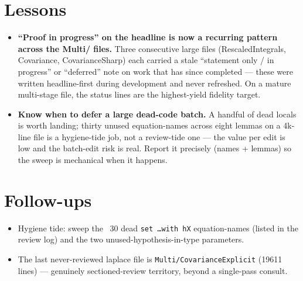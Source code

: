\documentclass[11pt]{article}
\begin{document}
\section{Lessons}
\begin{itemize}[noitemsep]
  \item \textbf{``Proof in progress'' on the headline is now a recurring pattern across the Multi/
    files.} Three consecutive large files (RescaledIntegrals, Covariance, CovarianceSharp) each carried
    a stale ``statement only / in progress'' or ``deferred'' note on work that has since completed ---
    these were written headline-first during development and never refreshed. On a mature multi-stage
    file, the status lines are the highest-yield fidelity target.
  \item \textbf{Know when to defer a large dead-code batch.} A handful of dead locals is worth landing;
    thirty unused equation-names across eight lemmas on a 4k-line file is a hygiene-tide job, not a
    review-tide one --- the value per edit is low and the batch-edit risk is real. Report it precisely
    (names + lemmas) so the sweep is mechanical when it happens.
\end{itemize}

\section{Follow-ups}
\begin{itemize}[noitemsep]
  \item Hygiene tide: sweep the ~30 dead \texttt{set \dots with hX} equation-names (listed in the
    review log) and the two unused-hypothesis-in-type parameters.
  \item The last never-reviewed laplace file is \texttt{Multi/CovarianceExplicit} (19611 lines) ---
    genuinely sectioned-review territory, beyond a single-pass consult.
\end{itemize}
\end{document}
